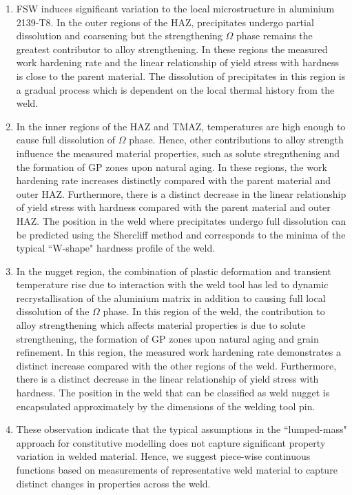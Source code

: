 	\begin{enumerate}
		\item FSW induces significant variation to the local microstructure in aluminium 2139-T8. In the outer regions of the HAZ, precipitates undergo partial dissolution and coarsening but the strengthening $\Omega$ phase remains the greatest contributor to alloy strengthening. In these regions the measured work hardening rate and the linear relationship of yield stress with hardness is close to the parent material. The dissolution of precipitates in this region is a gradual process which is dependent on the local thermal history from the weld. 
		
		\item In the inner regions of the HAZ and TMAZ, temperatures are high enough to cause full dissolution of $\Omega$ phase. Hence, other contributions to alloy strength influence the measured material properties, such as solute stregnthening and the formation of GP zones upon natural aging. In these regions, the work hardening rate increases distinctly compared with the parent material and outer HAZ. Furthermore, there is a distinct decrease in the linear relationship of yield stress with hardness compared with the parent material and outer HAZ. The position in the weld where precipitates undergo full dissolution can be predicted using the Shercliff method and corresponds to the minima of the typical ``W-shape" hardness profile of the weld.
		
		\item In the nugget region, the combination of plastic deformation and transient temperature rise due to interaction with the weld tool has led to dynamic recrystallisation of the aluminium matrix in addition to causing full local dissolution of the $\Omega$ phase. In this region of the weld, the contribution to alloy strengthening which affects material properties is due to solute strengthening, the formation of GP zones upon natural aging and grain refinement. In this region, the measured work hardening rate demonstrates a distinct increase compared with the other regions of the weld. Furthermore, there is a distinct decrease in the linear relationship of yield stress with hardness. The position in the weld that can be classified as weld nugget is encapsulated approximately by the dimensions of the welding tool pin.
		
		\item These observation indicate that the typical assumptions in the ``lumped-mass" approach for constitutive modelling does not capture significant property variation in welded material. Hence, we suggest piece-wise continuous functions based on measurements of representative weld material to capture distinct changes in properties across the weld.
	\end{enumerate}
	
